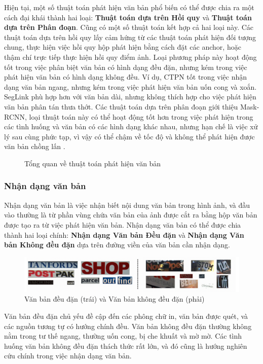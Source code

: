 Hiện tại, một số thuật toán phát hiện văn bản phổ biến có thể được chia ra một cách đại khái thành hai loại: \textbf{Thuật toán dựa trên Hồi quy} và \textbf{Thuật toán dựa trên Phân đoạn}. Cũng có một số thuật toán kết hợp cả hai loại này. Các thuật toán dựa trên hồi quy lấy cảm hứng từ các thuật toán phát hiện đối tượng chung, thực hiện việc hồi quy hộp phát hiện bằng cách đặt các anchor, hoặc thậm chí trực tiếp thực hiện hồi quy điểm ảnh. Loại phương pháp này hoạt động tốt trong việc phân biệt văn bản có hình dạng đều đặn, nhưng kém trong việc phát hiện văn bản có hình dạng không đều. Ví dụ, CTPN tốt trong việc nhận dạng văn bản ngang, nhưng kém trong việc phát hiện văn bản uốn cong và xoắn. SegLink phù hợp hơn với văn bản dài, nhưng không thích hợp cho việc phát hiện văn bản phân tán thưa thớt. Các thuật toán dựa trên phân đoạn giới thiệu Mask-RCNN, loại thuật toán này có thể hoạt động tốt hơn trong việc phát hiện trong các tình huống và văn bản có các hình dạng khác nhau, nhưng hạn chế là việc xử lý sau cùng phức tạp, vì vậy có thể chậm về tốc độ và không thể phát hiện được văn bản chồng lấn \cite{Dive-into-ocr-2022}.

\begin{figure}[h]
    
    \centering
    \caption{Tổng quan về thuật toán phát hiện văn bản}
\end{figure}
\subsubsection{Nhận dạng văn bản}
Nhận dạng văn bản là việc nhận biết nội dung văn bản trong hình ảnh, và đầu vào thường là từ phần vùng chứa văn bản của ảnh được cắt ra bằng hộp văn bản được tạo ra từ việc phát hiện văn bản. Nhận dạng văn bản có thể được chia thành hai loại chính: \textbf{Nhận dạng Văn bản Đều đặn} và \textbf{Nhận dạng Văn bản Không đều đặn} dựa trên đường viền của văn bản cần nhận dạng.

\begin{figure}[h]
    \includegraphics[scale=0.4]{images/regular-irregular-text.png}
    \centering
    \caption{Văn bản đều đặn (trái) và Văn bản không đều đặn (phải)}
\end{figure}

Văn bản đều đặn chủ yếu đề cập đến các phông chữ in, văn bản được quét, và các nguồn tương tự có hướng chính đều. Văn bản không đều đặn thường không nằm trong tư thế ngang, thường uốn cong, bị che khuất và mờ mờ. Các tình huống văn bản không đều đặn thách thức rất lớn, và đó cũng là hướng nghiên cứu chính trong việc nhận dạng văn bản.

